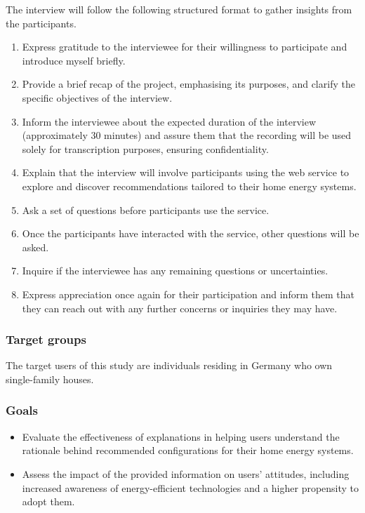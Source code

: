 The interview will follow the following structured format to gather insights from the participants. 
\begin{enumerate}
  \item Express gratitude to the interviewee for their willingness to participate and introduce myself briefly.
  \item Provide a brief recap of the project, emphasising its purposes, and clarify the specific objectives of the interview.
  \item Inform the interviewee about the expected duration of the interview (approximately 30 minutes) and assure them that the recording will be used solely for transcription purposes, ensuring confidentiality.
  \item Explain that the interview will involve participants using the web service to explore and discover recommendations tailored to their home energy systems.
  \item Ask a set of questions before participants use the service.
  \item Once the participants have interacted with the service, other questions will be asked.
  \item Inquire if the interviewee has any remaining questions or uncertainties.
  \item Express appreciation once again for their participation and inform them that they can reach out with any further concerns or inquiries they may have.
\end{enumerate}


\subsubsection{Target groups}

The target users of this study are individuals residing in Germany who own single-family houses.


\subsubsection{Goals}

\begin{itemize}
  \item Evaluate the effectiveness of explanations in helping users understand the rationale behind recommended configurations for their home energy systems.
  \item Assess the impact of the provided information on users' attitudes, including increased awareness of energy-efficient technologies and a higher propensity to adopt them. 
\end{itemize}


